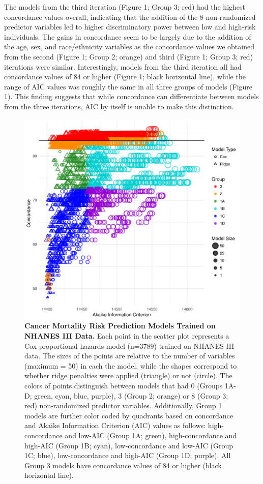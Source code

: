 \documentclass[12pt,oneside]{reedthesis}
\theoremstyle{definition}
\theoremstyle{definition}
\theoremstyle{definition}
\theoremstyle{remark}
\begin{document}
The models from the third iteration (Figure 1; Group 3; red) had the
highest concordance values overall, indicating that the addition of the
8 non-randomized predictor variables led to higher discriminatory power
between low and high-risk individuals. The gains in concordance seem to
be largely due to the addition of the age, sex, and race/ethnicity
variables as the concordance values we obtained from the second (Figure
1; Group 2; orange) and third (Figure 1; Group 3; red) iterations were
similar. Interestingly, models from the third iteration all had
concordance values of 84 or higher (Figure 1; black horizontal line),
while the range of AIC values was roughly the same in all three groups
of models (Figure 1). This finding suggests that while concordance can
differentiate between models from the three iterations, AIC by itself is
unable to make this distinction.
\begin{figure}
\centering
\includegraphics[width=\textwidth,height=0.6\textheight]{figure/1-quad-final.pdf}
\caption{\textbf{Cancer Mortality Risk Prediction Models Trained on
NHANES III Data.} Each point in the scatter plot represents a Cox
proportional hazards model (n=3789) trained on NHANES III data. The
sizes of the points are relative to the number of variables (maximum =
50) in each the model, while the shapes correspond to whether ridge
penalties were applied (triangle) or not (circle). The colors of points
distinguish between models that had 0 (Groups 1A-D; green, cyan, blue,
purple), 3 (Group 2; orange) or 8 (Group 3; red) non-randomized
predictor variables. Additionally, Group 1 models are further color
coded by quadrants based on concordance and Akaike Information Criterion
(AIC) values as follows: high-concordance and low-AIC (Group 1A; green),
high-concordance and high-AIC (Group 1B; cyan), low-concordance and
low-AIC (Group 1C; blue), low-concordance and high-AIC (Group 1D;
purple). All Group 3 models have concordance values of 84 or higher
(black horizontal line).}
\end{figure}
\end{document}
